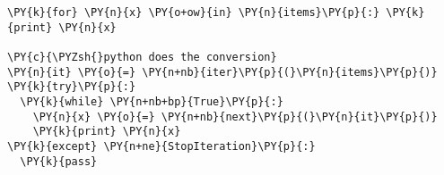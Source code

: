 \begin{Verbatim}[commandchars=\\\{\}]
\PY{k}{for} \PY{n}{x} \PY{o+ow}{in} \PY{n}{items}\PY{p}{:} \PY{k}{print} \PY{n}{x}

\PY{c}{\PYZsh{}python does the conversion}
\PY{n}{it} \PY{o}{=} \PY{n+nb}{iter}\PY{p}{(}\PY{n}{items}\PY{p}{)}
\PY{k}{try}\PY{p}{:}
  \PY{k}{while} \PY{n+nb+bp}{True}\PY{p}{:}
    \PY{n}{x} \PY{o}{=} \PY{n+nb}{next}\PY{p}{(}\PY{n}{it}\PY{p}{)}
    \PY{k}{print} \PY{n}{x}
\PY{k}{except} \PY{n+ne}{StopIteration}\PY{p}{:}
  \PY{k}{pass} 
\end{Verbatim}
